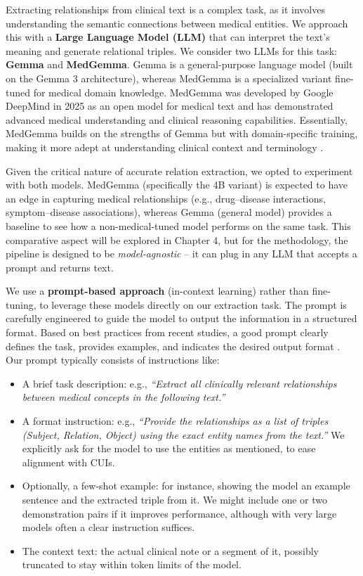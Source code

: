 Extracting relationships from clinical text is a complex task, as it involves understanding the semantic connections between medical entities. We approach this with a \textbf{Large Language Model (LLM)} that can interpret the text's meaning and generate relational triples. We consider two LLMs for this task: \textbf{Gemma} and \textbf{MedGemma}. Gemma is a general-purpose language model (built on the Gemma 3 architecture), whereas MedGemma is a specialized variant fine-tuned for medical domain knowledge. MedGemma was developed by Google DeepMind in 2025 as an open model for medical text and has demonstrated advanced medical understanding and clinical reasoning capabilities. Essentially, MedGemma builds on the strengths of Gemma but with domain-specific training, making it more adept at understanding clinical context and terminology \parencite{MedGemma2025,Gemma2025}.

Given the critical nature of accurate relation extraction, we opted to experiment with both models. MedGemma (specifically the 4B variant) is expected to have an edge in capturing medical relationships (e.g., drug–disease interactions, symptom–disease associations), whereas Gemma (general model) provides a baseline to see how a non-medical-tuned model performs on the same task. This comparative aspect will be explored in Chapter 4, but for the methodology, the pipeline is designed to be \textit{model-agnostic} – it can plug in any LLM that accepts a prompt and returns text.

We use a \textbf{prompt-based approach} (in-context learning) rather than fine-tuning, to leverage these models directly on our extraction task. The prompt is carefully engineered to guide the model to output the information in a structured format. Based on best practices from recent studies, a good prompt clearly defines the task, provides examples, and indicates the desired output format \parencite{Reynolds2021}. Our prompt typically consists of instructions like:

\begin{itemize}
\item A brief task description: e.g., \textit{``Extract all clinically relevant relationships between medical concepts in the following text.''}
\item A format instruction: e.g., \textit{``Provide the relationships as a list of triples (Subject, Relation, Object) using the exact entity names from the text.''} We explicitly ask for the model to use the entities as mentioned, to ease alignment with CUIs.
\item Optionally, a few-shot example: for instance, showing the model an example sentence and the extracted triple from it. We might include one or two demonstration pairs if it improves performance, although with very large models often a clear instruction suffices.
\item The context text: the actual clinical note or a segment of it, possibly truncated to stay within token limits of the model.
\end{itemize}

